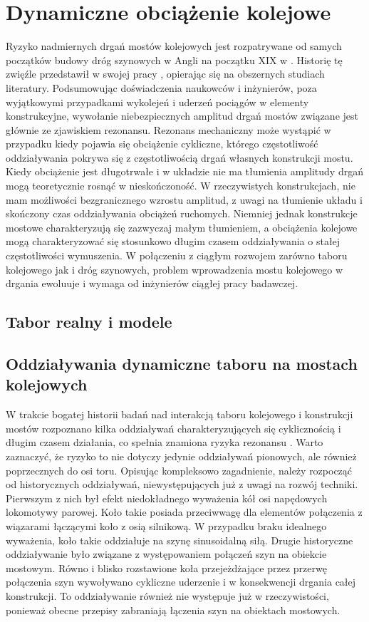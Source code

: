 \section{Dynamiczne obciążenie kolejowe}
Ryzyko nadmiernych drgań mostów kolejowych jest rozpatrywane od samych początków budowy dróg szynowych w Angli na początku XIX w \parencite{Ladislav1996}. Historię tę zwięźle przedstawił w swojej pracy \cite{Szafranski2013}, opierając się na obszernych studiach literatury. Podsumowując doświadczenia naukowców i inżynierów, poza wyjątkowymi przypadkami wykolejeń i uderzeń pociągów w elementy konstrukcyjne, wywołanie niebezpiecznych amplitud drgań mostów związane jest głównie ze zjawiskiem rezonansu. Rezonans mechaniczny może wystąpić w przypadku kiedy pojawia się obciążenie cykliczne, którego częstotliwość oddziaływania pokrywa się z częstotliwością drgań własnych konstrukcji mostu. Kiedy obciążenie jest długotrwałe i w układzie nie ma tłumienia amplitudy drgań mogą teoretycznie rosnąć w nieskończoność. W rzeczywistych konstrukcjach, nie mam możliwości bezgranicznego wzrostu amplitud, z uwagi na tłumienie układu i skończony czas oddziaływania obciążeń ruchomych. Niemniej jednak konstrukcje mostowe charakteryzują się zazwyczaj małym tłumieniem, a obciążenia kolejowe mogą charakteryzować się stosunkowo długim czasem oddziaływania o stałej częstotliwości wymuszenia. W połączeniu z ciągłym rozwojem zarówno taboru kolejowego jak i dróg szynowych, problem wprowadzenia mostu kolejowego w drgania ewoluuje i wymaga od inżynierów ciągłej pracy badawczej.



\subsection{Tabor realny i modele}
\parencite{J.M.Goicolea-Ruigomez2008}


\subsection{Oddziaływania dynamiczne taboru na mostach kolejowych}
W trakcie bogatej historii badań nad interakcją taboru kolejowego i konstrukcji mostów rozpoznano kilka oddziaływań charakteryzujących się cyklicznością i długim czasem działania, co spełnia znamiona ryzyka rezonansu \parencite{Fryba2001}. Warto zaznaczyć, że ryzyko to nie dotyczy jedynie oddziaływań pionowych, ale również poprzecznych do osi toru. Opisując kompleksowo zagadnienie, należy rozpocząć od historycznych oddziaływań, niewystępujących już z uwagi na rozwój techniki. Pierwszym z nich był efekt niedokładnego wyważenia kół osi napędowych lokomotywy parowej. Koło takie posiada przeciwwagę dla elementów połączenia z wiązarami łączącymi koło z osią silnikową. W przypadku braku idealnego wyważenia, koło takie oddziałuje na szynę sinusoidalną siłą. Drugie historyczne oddziaływanie było związane z występowaniem połączeń szyn na obiekcie mostowym. Równo i blisko rozstawione koła przejeżdżające przez przerwę połączenia szyn wywoływano cykliczne uderzenie i w konsekwencji drgania całej konstrukcji. To oddziaływanie również nie występuje już w rzeczywistości, ponieważ obecne przepisy zabraniają łączenia szyn na obiektach mostowych.

